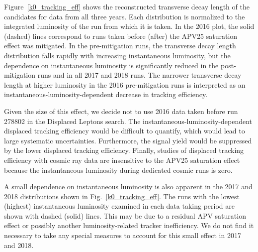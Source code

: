 Figure~\ref{k0_tracking_eff} shows the reconstructed transverse decay length of the \Kzero candidates for data from all three years. Each distribution is normalized to the integrated luminosity of the run from which it is taken. In the 2016 plot, the solid (dashed) lines correspond to runs taken before (after) the APV25 saturation effect was mitigated. In the pre-mitigation runs, the \Kzero transverse decay length distribution falls rapidly with increasing instantaneous luminosity, but the dependence on instantaneous luminosity is significantly reduced in the post-mitigation runs and in all 2017 and 2018 runs. The narrower transverse decay length at higher luminosity in the 2016 pre-mitigation runs is interpreted as an instantaneous-luminosity-dependent decrease in tracking efficiency.



Given the size of this effect, we decide not to use 2016 data taken before run 278802 in the Displaced Leptons search. The instantaneous-luminosity-dependent displaced tracking efficiency would be difficult to quantify, which would lead to large systematic uncertainties. Furthermore, the signal yield would be suppressed by the lower displaced tracking efficiency. Finally, studies of displaced tracking efficiency with cosmic ray data are insensitive to the APV25 saturation effect because the instantaneous luminosity during dedicated cosmic runs is zero.

A small dependence on instantaneous luminosity is also apparent in the 2017 and 2018 distributions shown in Fig.~\ref{k0_tracking_eff}. The runs with the lowest (highest) instantaneous luminosity examined in each data taking period are shown with dashed (solid) lines. This may be due to a residual APV saturation effect or possibly another luminosity-related tracker inefficiency. We do not find it necessary to take any special measures to account for this small effect in 2017 and 2018.

